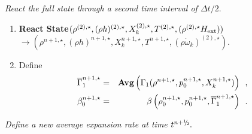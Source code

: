 \documentclass[11pt]{article}
\newcommand{\gammabar}{\overline{\Gamma}_1}
\newcommand{\sfrac}[2]{\mathchoice
  {\kern0em\raise.5ex\hbox{\the\scriptfont0 #1}\kern-.15em/
   \kern-.15em\lower.25ex\hbox{\the\scriptfont0 #2}}
  {\kern0em\raise.5ex\hbox{\the\scriptfont0 #1}\kern-.15em/
   \kern-.15em\lower.25ex\hbox{\the\scriptfont0 #2}}
  {\kern0em\raise.5ex\hbox{\the\scriptscriptfont0 #1}\kern-.2em/
   \kern-.15em\lower.25ex\hbox{\the\scriptscriptfont0 #2}}
  {#1\!/#2}}
\newcommand{\myhalf}{\sfrac{1}{2}}
\newcommand{\nph}{{n + \myhalf}}
\newcommand{\Hext}{{H_{\rm ext}}}
\newcommand{\dt}{\Delta t}
\newcommand{\omegadot}{\dot{\omega}}
\begin{document}
 {\em React the full state through a second time interval of $\dt / 2.$}

\begin{enumerate}
\renewcommand{\theenumi}{{\bf \alph{enumi}}}

\item {\bf React State}$( \rho^{(2),\star},(\rho h)^{(2),\star}, X_k^{(2),\star}, 
                             T^{(2),\star}, (\rho^{(2),\star} \Hext)) $\\
$\rightarrow ( \rho^{n+1,\star},(\rho h)^{n+1,\star}, X_k^{n+1,\star}, T^{n+1,\star}, 
              (\rho \omegadot_k)^{(2),\star} ).$  

\item Define
\begin{eqnarray}
 \gammabar^{n+1,\star}    &=& {\rm{\bf Avg}} \left( \Gamma_1(\rho^{n+1,\star}, p_0^{n+1,\star}, 
                                                      X_k^{n+1,\star}) \right) \enskip , \nonumber \\
 {\beta   }_0^{n+1,\star}    &=& \beta   \left(\rho_0^{n+1,\star}, p_0^{n+1,\star}, \gammabar^{n+1,\star}\right) \enskip .
\end{eqnarray}

\end{enumerate}

 {\em Define a new average expansion rate at time $t^\nph.$}
\end{document}
